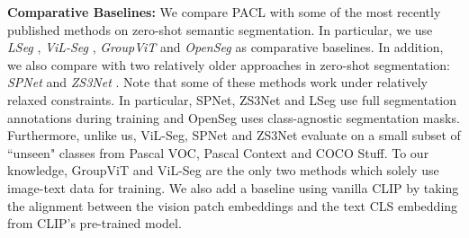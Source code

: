 \documentclass[10pt,twocolumn,letterpaper]{article}
\begin{document}
\textbf{Comparative Baselines:} We compare PACL with some of the most recently published methods on zero-shot semantic segmentation. In particular, we use \emph{LSeg} \cite{li2022language}, \emph{ViL-Seg} \cite{liu2022open}, \emph{GroupViT} \cite{xu2022groupvit} and \emph{OpenSeg} \cite{ghiasi2021open} as comparative baselines. In addition, we also compare with two relatively older approaches in zero-shot segmentation: \emph{SPNet} \cite{xian2019semantic} and \emph{ZS3Net} \cite{bucher2019zero}. Note that some of these methods work under relatively relaxed constraints. In particular, SPNet, ZS3Net and LSeg use full segmentation annotations during training and OpenSeg uses class-agnostic segmentation masks. Furthermore, unlike us, ViL-Seg, SPNet and ZS3Net evaluate on a small subset of ``unseen" classes from Pascal VOC, Pascal Context and COCO Stuff. To our knowledge, GroupViT and ViL-Seg are the only two methods which solely use image-text data for training. We also add a baseline using vanilla CLIP by taking the alignment between the vision patch embeddings and the text CLS embedding from CLIP's pre-trained model.
\end{document}
